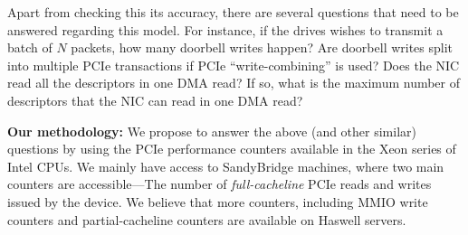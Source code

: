 Apart from checking this its accuracy, there are several questions that need to
be answered regarding this model. For instance, if the drives wishes to transmit a batch
of $N$ packets, how many doorbell writes happen?  Are doorbell writes split into
multiple PCIe transactions if PCIe ``write-combining'' is used? Does the NIC read
all the descriptors in one DMA read?  If so, what is the maximum number of descriptors
that the NIC can read in one DMA read?

\textbf{Our methodology:} We propose to answer the above (and other similar)
questions by using the PCIe performance counters available in the Xeon series of
Intel CPUs.  We mainly have access to SandyBridge machines, where two main counters
are accessible---The number of \emph{full-cacheline} PCIe reads and writes issued
by the device.  We believe that more counters, including MMIO write counters
and partial-cacheline counters are available on Haswell servers.




